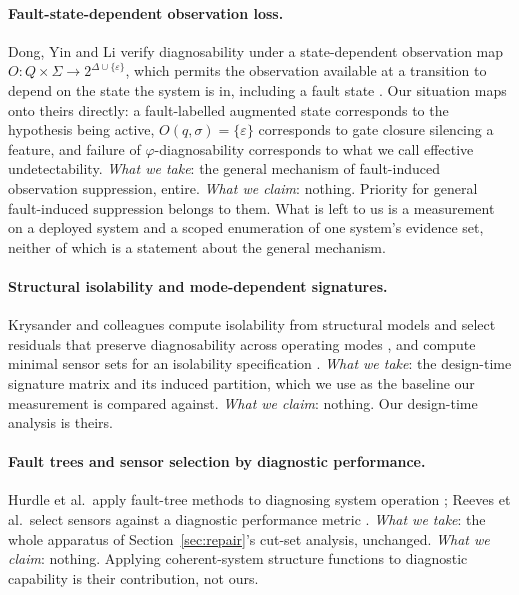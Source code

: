 \documentclass[11pt,a4paper]{article}
\begin{document}
\paragraph{Fault-state-dependent observation loss.}
Dong, Yin and Li verify diagnosability under a state-dependent observation map
$O: Q \times \Sigma \to 2^{\Delta \cup \{\varepsilon\}}$, which permits the
observation available at a transition to depend on the state the system is in,
including a fault state \cite{dong2024statedependent}. Our situation maps onto
theirs directly: a fault-labelled augmented state corresponds to the hypothesis
being active, $O(q,\sigma) = \{\varepsilon\}$ corresponds to gate closure
silencing a feature, and failure of $\varphi$-diagnosability corresponds to
what we call effective undetectability. \emph{What we take}: the general
mechanism of fault-induced observation suppression, entire.
\emph{What we claim}: nothing. Priority for general fault-induced suppression
belongs to them. What is left to us is a measurement on a deployed system and
a scoped enumeration of one system's evidence set, neither of which is a
statement about the general mechanism.

\paragraph{Structural isolability and mode-dependent signatures.}
Krysander and colleagues compute isolability from structural models and select
residuals that preserve diagnosability across operating modes
\cite{krysander2024multimode}, and compute minimal sensor sets for an
isolability specification \cite{krysander2008sensorplacement}. \emph{What we
take}: the design-time signature matrix and its induced partition, which we
use as the baseline our measurement is compared against. \emph{What we claim}:
nothing. Our design-time analysis is theirs.

\paragraph{Fault trees and sensor selection by diagnostic performance.}
Hurdle et al.\ apply fault-tree methods to diagnosing system operation
\cite{hurdle2007faulttree}; Reeves et al.\ select sensors against a diagnostic
performance metric \cite{reeves2019sensorselection}. \emph{What we take}: the
whole apparatus of Section~\ref{sec:repair}'s cut-set analysis, unchanged.
\emph{What we claim}: nothing. Applying coherent-system structure functions to
diagnostic capability is their contribution, not ours.
\end{document}
